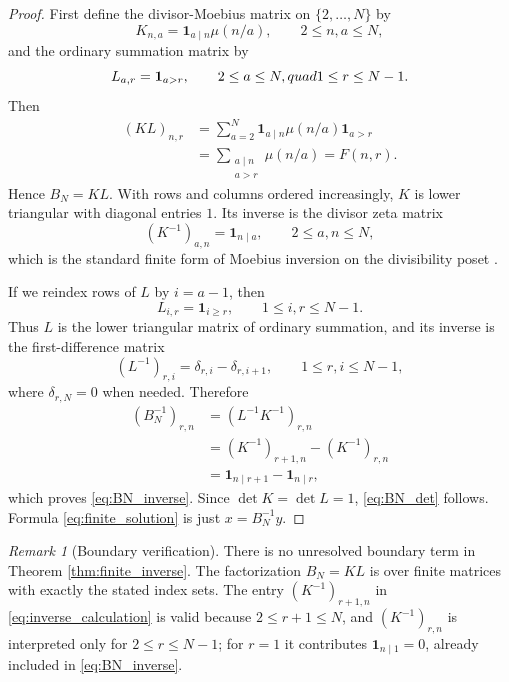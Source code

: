 \documentclass[11pt]{amsart}
\numberwithin{equation}{section}
\theoremstyle{plain}
\theoremstyle{definition}
\theoremstyle{remark}
\newtheorem{remark}[theorem]{Remark}
\newcommand{\one}{\mathbf 1}
\newcommand{\mob}{\mu}
\newcommand{\Fsurf}{F}
\begin{document}
\begin{proof}
First define the divisor-Moebius matrix on \(\{2,\ldots,N\}\) by
\begin{equation}
K_{n,a}=\one_{a\mid n}\mob(n/a),
\qquad 2\le n,a\le N,
\label{eq:K_def}
\end{equation}
and the ordinary summation matrix by
\begin{equation}
L_{a,r}=\one_{a>r},
\qquad 2\le a\le N,\\quad 1\le r\le N-1.
\label{eq:L_def}
\end{equation}
Then
\begin{align}
(KL)_{n,r}
&=\sum_{a=2}^{N}\one_{a\mid n}\mob(n/a)\one_{a>r} \\
&=\sum_{\substack{a\mid n\\a>r}}\mob(n/a)
=\Fsurf(n,r).
\label{eq:KL_equals_B}
\end{align}
Hence \(B_N=KL\).  With rows and columns ordered increasingly, \(K\) is lower triangular with diagonal entries \(1\).  Its inverse is the divisor zeta matrix
\begin{equation}
(K^{-1})_{a,n}=\one_{n\mid a},
\qquad 2\le a,n\le N,
\label{eq:K_inverse}
\end{equation}
which is the standard finite form of Moebius inversion on the divisibility poset \cite{Mobius1832,Rota1964,Stanley2012}.

If we reindex rows of \(L\) by \(i=a-1\), then
\begin{equation}
L_{i,r}=\one_{i\ge r},
\qquad 1\le i,r\le N-1.
\label{eq:L_reindexed}
\end{equation}
Thus \(L\) is the lower triangular matrix of ordinary summation, and its inverse is the first-difference matrix
\begin{equation}
(L^{-1})_{r,i}=\delta_{r,i}-\delta_{r,i+1},
\qquad 1\le r,i\le N-1,
\label{eq:L_inverse}
\end{equation}
where \(\delta_{r,N}=0\) when needed.  Therefore
\begin{align}
(B_N^{-1})_{r,n}
&=(L^{-1}K^{-1})_{r,n} \\
&=(K^{-1})_{r+1,n}-(K^{-1})_{r,n} \\
&=\one_{n\mid r+1}-\one_{n\mid r},
\label{eq:inverse_calculation}
\end{align}
which proves \eqref{eq:BN_inverse}.  Since \(\det K=\det L=1\), \eqref{eq:BN_det} follows.  Formula \eqref{eq:finite_solution} is just \(x=B_N^{-1}y\).
\end{proof}

\begin{remark}[Boundary verification]
\label{rem:boundary_verification}
There is no unresolved boundary term in Theorem \ref{thm:finite_inverse}.  The factorization \(B_N=KL\) is over finite matrices with exactly the stated index sets.  The entry \((K^{-1})_{r+1,n}\) in \eqref{eq:inverse_calculation} is valid because \(2\le r+1\le N\), and \((K^{-1})_{r,n}\) is interpreted only for \(2\le r\le N-1\); for \(r=1\) it contributes \(\one_{n\mid1}=0\), already included in \eqref{eq:BN_inverse}.
\end{remark}
\end{document}
